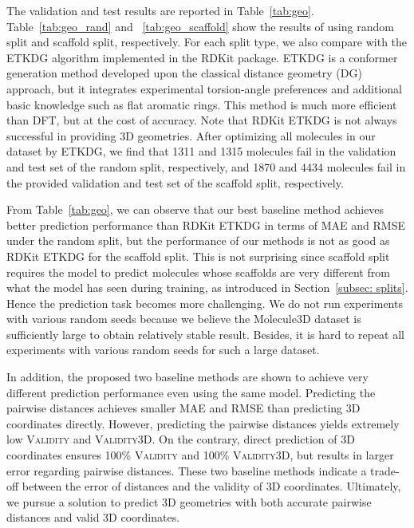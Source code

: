 \documentclass{article}
\begin{document}
The validation and test results are reported in Table~\ref{tab:geo}. Table~\ref{tab:geo_rand} and ~\ref{tab:geo_scaffold} show the results of using random split and scaffold split, respectively. For each split type, we also compare with the ETKDG algorithm \cite{riniker2015better} implemented in the RDKit \cite{rdkit} package. ETKDG is a conformer generation method developed upon the classical distance geometry (DG) \cite{blaney1994distance, havel1998distance} approach, but it integrates experimental torsion-angle preferences and additional basic knowledge such as flat aromatic rings. This method is much more efficient than DFT, but at the cost of accuracy. Note that RDKit ETKDG is not always successful in providing 3D geometries. After optimizing all molecules in our dataset by ETKDG, we find that 1311 and 1315 molecules fail in the validation and test set of the random split, respectively, and 1870 and 4434 molecules fail in the provided validation and test set of the scaffold split, respectively. 

From Table~\ref{tab:geo}, we can observe that our best baseline method achieves better prediction performance than RDKit ETKDG in terms of MAE and RMSE under the random split, but the performance of our methods is not as good as RDKit ETKDG for the scaffold split. This is not surprising since scaffold split requires the model to predict molecules whose scaffolds are very different from what the model has seen during training, as introduced in Section~\ref{subsec: splits}. Hence the prediction task becomes more challenging. We do not run experiments with various random seeds because we believe the Molecule3D dataset is sufficiently large to obtain relatively stable result. Besides, it is hard to repeat all experiments with various random seeds for such a large dataset.

In addition, the proposed two baseline methods are shown to achieve very different prediction performance even using the same model. Predicting the pairwise distances achieves smaller MAE and RMSE than predicting 3D coordinates directly. However, predicting the pairwise distances yields extremely low \textsc{Validity} and \textsc{Validity3D}. On the contrary, direct prediction of 3D coordinates ensures 100\% \textsc{Validity} and 100\% \textsc{Validity3D}, but results in larger error regarding pairwise distances. These two baseline methods indicate a trade-off between the error of distances and the validity of 3D coordinates. Ultimately, we pursue a solution to predict 3D geometries with both accurate pairwise distances and valid 3D coordinates.
\end{document}
